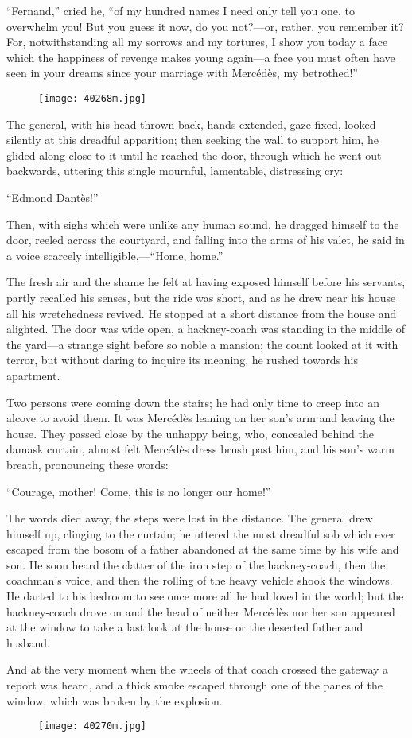 “Fernand,” cried he, “of my hundred names I need only tell you one, to
overwhelm you! But you guess it now, do you not?—or, rather, you
remember it? For, notwithstanding all my sorrows and my tortures, I
show you today a face which the happiness of revenge makes young
again—a face you must often have seen in your dreams since your
marriage with Mercédès, my betrothed!”

\begin{figure}[ht]
\texttt{[image: 40268m.jpg]}
\end{figure}

The general, with his head thrown back, hands extended, gaze fixed,
looked silently at this dreadful apparition; then seeking the wall to
support him, he glided along close to it until he reached the door,
through which he went out backwards, uttering this single mournful,
lamentable, distressing cry:

“Edmond Dantès!”

Then, with sighs which were unlike any human sound, he dragged himself
to the door, reeled across the courtyard, and falling into the arms of
his valet, he said in a voice scarcely intelligible,—“Home, home.”

The fresh air and the shame he felt at having exposed himself before
his servants, partly recalled his senses, but the ride was short, and
as he drew near his house all his wretchedness revived. He stopped at a
short distance from the house and alighted. The door was wide open, a
hackney-coach was standing in the middle of the yard—a strange sight
before so noble a mansion; the count looked at it with terror, but
without daring to inquire its meaning, he rushed towards his apartment.

Two persons were coming down the stairs; he had only time to creep into
an alcove to avoid them. It was Mercédès leaning on her son’s arm and
leaving the house. They passed close by the unhappy being, who,
concealed behind the damask curtain, almost felt Mercédès dress brush
past him, and his son’s warm breath, pronouncing these words:

“Courage, mother! Come, this is no longer our home!”

The words died away, the steps were lost in the distance. The general
drew himself up, clinging to the curtain; he uttered the most dreadful
sob which ever escaped from the bosom of a father abandoned at the same
time by his wife and son. He soon heard the clatter of the iron step of
the hackney-coach, then the coachman’s voice, and then the rolling of
the heavy vehicle shook the windows. He darted to his bedroom to see
once more all he had loved in the world; but the hackney-coach drove on
and the head of neither Mercédès nor her son appeared at the window to
take a last look at the house or the deserted father and husband.

And at the very moment when the wheels of that coach crossed the
gateway a report was heard, and a thick smoke escaped through one of
the panes of the window, which was broken by the explosion.

\begin{figure}[ht]
\texttt{[image: 40270m.jpg]}
\end{figure}
